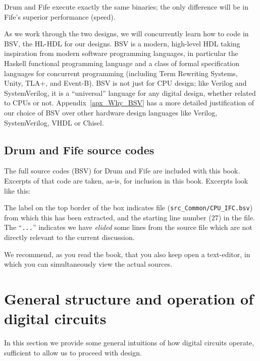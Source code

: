 Drum and Fife execute exactly the same binaries; the only difference
will be in Fife's superior performance (speed).

As we work through the two designs, we will concurrently learn how to
code in BSV, the HL-HDL for our designs.  BSV is a modern, high-level
HDL taking inspiration from modern software programming languages, in
particular the Haskell functional programming language and a class of
formal specification languages for concurrent programming (including
Term Rewriting Systems, Unity, TLA+, and Event-B).  BSV is not just
for CPU design; like Verilog and SystemVerilog, it is a ``universal''
language for any digital design, whether related to CPUs or not.
Appendix~\ref{apx_Why_BSV} has a more detailed justification of our
choice of BSV over other hardware design languages like Verilog,
SystemVerilog, VHDL or Chisel.


\subsection{Drum and Fife source codes}

The full source codes (BSV) for Drum and Fife are included with this
book.  Excerpts of that code are taken, as-is, for inclusion in this
book.  Excerpts look like this:



The label on the top border of the box indicates file
(\verb|src_Common/CPU_IFC.bsv|) from which this has been extracted,
and the starting line number (27) in the file.  The ``\verb|...|''
indicates we have \emph{elided} some lines from the source file which
are not directly relevant to the current discussion.

We recommend, as you read the book, that you also keep open a
text-editor, in which you can simultaneously view the actual sources.


\section{General structure and operation of digital circuits}

In this section we provide some general intuitions of how digital
circuits operate, sufficient to allow us to proceed with design.

